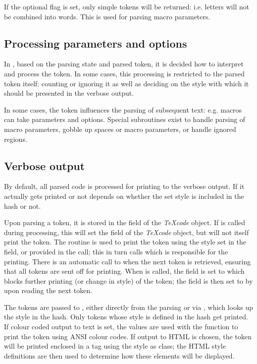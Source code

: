 \documentclass{article}
\newcommand\Obj[1]{\textsl{#1}}
\begin{document}
If the optional  flag is set, only simple tokens will be returned: i.e. letters will not be combined into words. This is used for parsing macro parameters.


\subsection{Processing parameters and options}

In , based on the parsing state and parsed token, it is decided how to interpret and process the token. In some cases, this processing is restricted to the parsed token itself: counting or ignoring it as well as deciding on the style with which it should be presented in the verbose output.

In some cases, the token influences the parsing of subsequent text: e.g. macros can take parameters and options. Special subroutines exist to handle parsing of macro parameters, gobble up spaces or macro parameters, or handle ignored regions.


\subsection{Verbose output}

By default, all parsed code is processed for printing to the verbose output. If it actually gets printed or not depends on whether the set style is included in the  hash or not. 

Upon parsing a token, it is stored in the  field of the \Obj{TeXcode} object. If  is called during processing, this will set the  field of the \Obj{TeXcode} object, but will not itself print the token. The  routine is used to print the  token using the style set in the  field, or provided in the call; this in turn calls  which is responsible for the printing. There is an automatic call to  when the next token is retrieved, ensuring that all tokens are sent off for printing. When  is called, the  field is set to  which blocks further printing (or change in style) of the token; the  field is then set to  by  upon reading the next token.

The tokens are passed to , either directly from the parsing or via , which looks up the style in the  hash. Only tokens whose style is defined in the  hash get printed. If colour coded output to text is set, the values  are used with the  function to print the token using ANSI colour codes. If output to HTML is chosen, the token will be printed enclosed in a  tag using the style as class; the HTML style definitions are then used to determine how these elements will be displayed.
\end{document}
